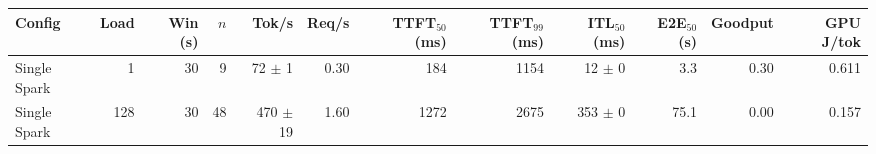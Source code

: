 \begin{tabular}{l r r r r r r r r r r r}
\toprule
Config & Load & Win (s) & $n$ & Tok/s & Req/s & TTFT$_{50}$ (ms) & TTFT$_{99}$ (ms) & ITL$_{50}$ (ms) & E2E$_{50}$ (s) & Goodput & GPU J/tok \\
\midrule
Single Spark & 1 & 30 & 9\rlap{$^\dagger$} & 72 $\pm$ 1 & 0.30 & 184 & 1154 & 12 $\pm$ 0 & 3.3 & 0.30 & 0.611 \\
Single Spark & 128 & 30 & 48\rlap{$^\dagger$} & 470 $\pm$ 19 & 1.60 & 1272 & 2675 & 353 $\pm$ 0 & 75.1 & 0.00 & 0.157 \\
\bottomrule
\end{tabular}
